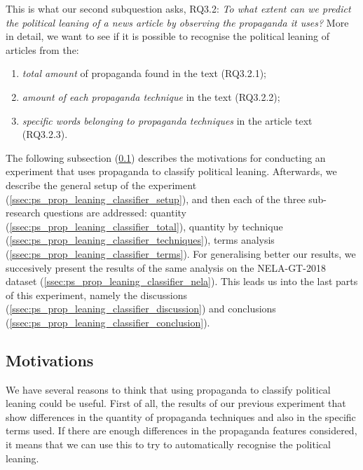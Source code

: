 This is what our second subquestion asks, RQ3.2: \emph{To what extent can we predict the political leaning of a news article by observing the propaganda it uses?}
More in detail, we want to see if it is possible to recognise the political leaning of articles from the:
\begin{enumerate}
    \item \emph{total amount} of propaganda found in the text (RQ3.2.1);
    \item \emph{amount of each propaganda technique} in the text (RQ3.2.2);
    \item \emph{specific words belonging to propaganda techniques} in the article text (RQ3.2.3).
\end{enumerate}

The following subsection (\ref{ssec:ps_prop_leaning_classifier_motivations}) describes the motivations for conducting an experiment that uses propaganda to classify political leaning. Afterwards, we describe the general setup of the experiment (\ref{ssec:ps_prop_leaning_classifier_setup}), and then each of the three sub-research questions are addressed: quantity (\ref{ssec:ps_prop_leaning_classifier_total}), quantity by technique (\ref{ssec:ps_prop_leaning_classifier_techniques}), terms analysis (\ref{ssec:ps_prop_leaning_classifier_terms}).
For generalising better our results, we succesively present the results of the same analysis on the NELA-GT-2018 dataset (\ref{ssec:ps_prop_leaning_classifier_nela}).
This leads us into the last parts of this experiment, namely the discussions (\ref{ssec:ps_prop_leaning_classifier_discussion}) and conclusions (\ref{ssec:ps_prop_leaning_classifier_conclusion}).

\subsection{Motivations}
\label{ssec:ps_prop_leaning_classifier_motivations}

We have several reasons to think that using propaganda to classify political leaning could be useful.
First of all, the results of our previous experiment that show differences in the quantity of propaganda techniques and also in the specific terms used.
If there are enough differences in the propaganda features considered, it means that we can use this to try to automatically recognise the political leaning.

